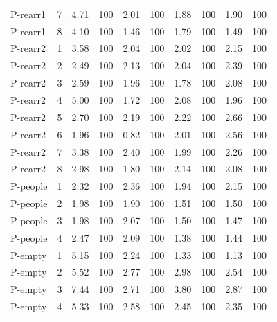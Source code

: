 \begin{longtable}{llrrrrrrrr}
P-rearr1 & 7 & 4.71 & 100 & 2.01 & 100 & 1.88 & 100 & 1.90 & 100\\
P-rearr1 & 8 & 4.10 & 100 & 1.46 & 100 & 1.79 & 100 & 1.49 & 100\\
\midrule
P-rearr2 & 1 & 3.58 & 100 & 2.04 & 100 & 2.02 & 100 & 2.15 & 100\\
P-rearr2 & 2 & 2.49 & 100 & 2.13 & 100 & 2.04 & 100 & 2.39 & 100\\
P-rearr2 & 3 & 2.59 & 100 & 1.96 & 100 & 1.78 & 100 & 2.08 & 100\\
P-rearr2 & 4 & 5.00 & 100 & 1.72 & 100 & 2.08 & 100 & 1.96 & 100\\
P-rearr2 & 5 & 2.70 & 100 & 2.19 & 100 & 2.22 & 100 & 2.66 & 100\\
P-rearr2 & 6 & 1.96 & 100 & 0.82 & 100 & 2.01 & 100 & 2.56 & 100\\
P-rearr2 & 7 & 3.38 & 100 & 2.40 & 100 & 1.99 & 100 & 2.26 & 100\\
P-rearr2 & 8 & 2.98 & 100 & 1.80 & 100 & 2.14 & 100 & 2.08 & 100\\
\midrule
P-people & 1 & 2.32 & 100 & 2.36 & 100 & 1.94 & 100 & 2.15 & 100\\
P-people & 2 & 1.98 & 100 & 1.90 & 100 & 1.51 & 100 & 1.50 & 100\\
P-people & 3 & 1.98 & 100 & 2.07 & 100 & 1.50 & 100 & 1.47 & 100\\
P-people & 4 & 2.47 & 100 & 2.09 & 100 & 1.38 & 100 & 1.44 & 100\\
\midrule
P-empty & 1 & 5.15 & 100 & 2.24 & 100 & 1.33 & 100 & 1.13 & 100\\
P-empty & 2 & 5.52 & 100 & 2.77 & 100 & 2.98 & 100 & 2.54 & 100\\
P-empty & 3 & 7.44 & 100 & 2.71 & 100 & 3.80 & 100 & 2.87 & 100\\
P-empty & 4 & 5.33 & 100 & 2.58 & 100 & 2.45 & 100 & 2.35 & 100\\
\end{longtable}
